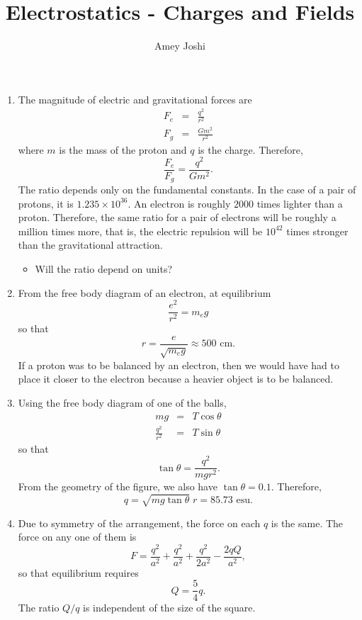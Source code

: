 \documentclass{article}
\title{Electrostatics - Charges and Fields}
\author{Amey Joshi}
\begin{document}
\begin{enumerate}
\item The magnitude of electric and gravitational forces are
\begin{eqnarray}
F_e &=& \frac{q^2}{r^2} \label{e1} \\
F_g &=& \frac{Gm^2}{r^2} \label{e2}
\end{eqnarray}
where $m$ is the mass of the proton and $q$ is the charge. Therefore,
\[
\frac{F_e}{F_g} = \frac{q^2}{Gm^2}.
\]
The ratio depends only on the fundamental constants. In the case of a pair of
protons, it is $1.235 \times 10^{36}$. An electron is roughly $2000$ times lighter
than a proton. Therefore, the same ratio for a pair of electrons will be roughly
a million times more, that is, the electric repulsion will be $10^{42}$ times
stronger than the gravitational attraction.

\begin{itemize}
\item Will the ratio depend on units?
\end{itemize}

\item From the free body diagram of an electron, at equilibrium 
\begin{equation}\label{e3}
\frac{e^2}{r^2} = m_eg
\end{equation}
so that
\begin{equation}\label{e4}
r = \frac{e}{\sqrt{m_e g}} \approx 500 \text{ cm}.
\end{equation}
If a proton was to be balanced by an electron, then we would have had to place it
closer to the electron because a heavier object is to be balanced.

\item Using the free body diagram of one of the balls,
\begin{eqnarray}
mg &=& T\cos\theta \label{e5} \\
\frac{q^2}{r^2} &=& T\sin\theta \label{e6}
\end{eqnarray}
so that
\[
\tan\theta = \frac{q^2}{mgr^2}.
\]
From the geometry of the figure, we also have $\tan\theta = 0.1$. Therefore,
\begin{equation}\label{e7}
q = \sqrt{mg\tan\theta}\; r = 85.73 \text{ esu}. 
\end{equation}

\item Due to symmetry of the arrangement, the force on each $q$ is the same. The
force on any one of them is
\[
F = \frac{q^2}{a^2} + \frac{q^2}{a^2} + \frac{q^2}{2a^2} - \frac{2qQ}{a^2},
\]
so that equilibrium requires
\begin{equation}\label{e8}
Q = \frac{5}{4}q.
\end{equation}
The ratio $Q/q$ is independent of the size of the square.


\end{enumerate}
\end{document}
